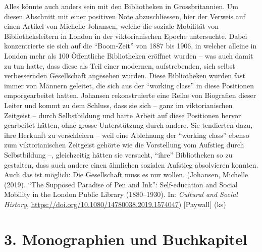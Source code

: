 \documentclass[a4paper,
fontsize=11pt,
oneside,
numbers=noperiodatend,
parskip=half-,
bibliography=totoc,
final
]{scrartcl}
\begin{document}
Alles könnte auch anders sein mit den Bibliotheken in Grossbritannien.
Um diesen Abschnitt mit einer positiven Note abzuschliessen, hier der
Verweis auf einen Artikel von Michelle Johansen, welche die soziale
Mobilität von Bibliotheksleitern in London in der viktorianischen Epoche
untersuchte. Dabei konzentrierte sie sich auf die \enquote{Boom-Zeit}
von 1887 bis 1906, in welcher alleine in London mehr als 100 Öffentliche
Bibliotheken eröffnet wurden -- was auch damit zu tun hatte, dass diese
als Teil einer modernen, aufstrebenden, sich selbst verbessernden
Gesellschaft angesehen wurden. Diese Bibliotheken wurden fast immer von
Männern geleitet, die sich aus der \enquote{working class} in diese
Positionen emporgearbeitet hatten. Johansen rekonstruierte eine Reihe
von Biografien dieser Leiter und kommt zu dem Schluss, dass sie sich --
ganz im viktorianischen Zeitgeist -- durch Selbstbildung und harte
Arbeit auf diese Positionen hervor gearbeitet hätten, ohne grosse
Unterstützung durch andere. Sie tendierten dazu, ihre Herkunft zu
verschleiern -- weil eine Ablehnung der \enquote{working class} ebenso
zum viktorianischen Zeitgeist gehörte wie die Vorstellung vom Aufstieg
durch Selbstbildung --, gleichzeitig hätten sie versucht, \enquote{ihre}
Bibliotheken so zu gestalten, dass auch andere einen ähnlichen sozialen
Aufstieg absolvieren konnten. Auch das ist möglich: Die Gesellschaft
muss es nur wollen. (Johansen, Michelle (2019). \enquote{The Supposed
Paradise of Pen and Ink}: Self-education and Social Mobility in the
London Public Library (1880--1930). In: \emph{Cultural and Social
History}, \url{https://doi.org/10.1080/14780038.2019.1574047})
{[}Paywall{]} (ks)

\hypertarget{monographien-und-buchkapitel}{%
\section*{3. Monographien und
Buchkapitel}\label{monographien-und-buchkapitel}}
\end{document}
